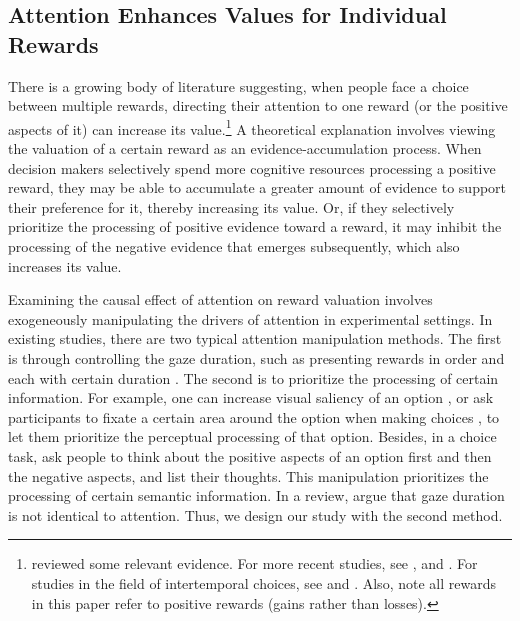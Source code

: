 \documentclass[
  12pt,
]{article}
\begin{document}
\hypertarget{attention-enhances-values-for-individual-rewards}{%
\subsection{\texorpdfstring{Attention Enhances Values for Individual
Rewards
\label{attention_value}}{Attention Enhances Values for Individual Rewards }}\label{attention-enhances-values-for-individual-rewards}}

There is a growing body of literature suggesting, when people face a
choice between multiple rewards, directing their attention to one reward
(or the positive aspects of it) can increase its value.\footnote{\citet{orquin2013attention}
  reviewed some relevant evidence. For more recent studies, see
  \citet{smith2019gaze}, \citet{gwinn2019spillover} and
  \citet{pleskac2023attention}. For studies in the field of
  intertemporal choices, see \citet{franco2016now} and
  \citet{fisher2021intertemporal}. Also, note all rewards in this paper
  refer to positive rewards (gains rather than losses).} A theoretical
explanation involves viewing the valuation of a certain reward as an
evidence-accumulation process. When decision makers selectively spend
more cognitive resources processing a positive reward, they may be able
to accumulate a greater amount of evidence to support their preference
for it, thereby increasing its value. Or, if they selectively prioritize
the processing of positive evidence toward a reward, it may inhibit the
processing of the negative evidence that emerges subsequently, which
also increases its value.

Examining the causal effect of attention on reward valuation involves
exogeneously manipulating the drivers of attention in experimental
settings. In existing studies, there are two typical attention
manipulation methods. The first is through controlling the gaze
duration, such as presenting rewards in order and each with certain
duration
\citep{shimojo2003gaze, armel2008biasing, fisher2021intertemporal, bhatnagar2022meta}.
The second is to prioritize the processing of certain information. For
example, one can increase visual saliency of an option
\citep{milosavljevic2012relative}, or ask participants to fixate a
certain area around the option when making choices
\citep{lim2011decision}, to let them prioritize the perceptual
processing of that option. Besides, in a choice task,
\citet{weber2007asymmetric} ask people to think about the positive
aspects of an option first and then the negative aspects, and list their
thoughts. This manipulation prioritizes the processing of certain
semantic information. In a review, \citet{mormann2021does} argue that
gaze duration is not identical to attention. Thus, we design our study
with the second method.
\end{document}
